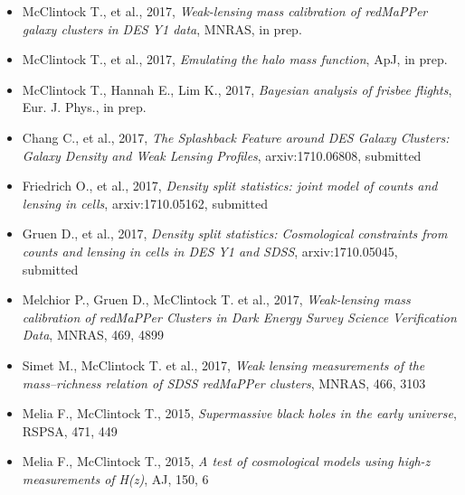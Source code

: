 \documentclass{res}
\begin{document}
\thispagestyle{empty} %
\address{{\bf Address} \\ 1308 E Spring Street \\
	University of Arizona \\  Tucson, Arizona, USA  \\ (631) 418-5304}
\address{{\bf On the web} \\\url{https://github.com/tmcclintock} \\
  \href{mailto:tmcclintock@email.arizona.edu}{tmcclintock@email.arizona.edu}}

\begin{resume}

\vspace{8pt}
\begin{itemize}\itemsep -2pt
\item McClintock T., et al., 2017, {\it Weak-lensing mass calibration of redMaPPer galaxy clusters in DES Y1 data}, MNRAS, in prep.
\item McClintock T., et al., 2017, {\it Emulating the halo mass function}, ApJ, in prep.
\item McClintock T., Hannah E., Lim K., 2017, {\it Bayesian analysis of frisbee flights}, Eur. J. Phys., in prep.
\item Chang C., et al., 2017, {\it The Splashback Feature around DES Galaxy Clusters: Galaxy Density and Weak Lensing Profiles}, arxiv:1710.06808, submitted
\item Friedrich O., et al., 2017, {\it Density split statistics: joint model of counts and lensing in cells},  arxiv:1710.05162, submitted
\item Gruen D., et al., 2017, {\it Density split statistics: Cosmological constraints from counts and lensing in cells in DES Y1 and SDSS}, arxiv:1710.05045, submitted
\item Melchior P., Gruen D., McClintock T. et al., 2017, {\it Weak-lensing mass calibration of redMaPPer Clusters in Dark Energy Survey Science Verification Data}, MNRAS, 469, 4899
\item Simet M., McClintock T. et al., 2017, {\it Weak lensing measurements of the mass--richness relation of SDSS redMaPPer clusters}, MNRAS, 466, 3103
\item Melia F., McClintock T., 2015, {\it Supermassive black holes in the early universe}, RSPSA, 471, 449
\item Melia F., McClintock T., 2015, {\it A test of cosmological models using high-z measurements of H(z)}, AJ, 150, 6
\end{itemize}  
 
\end{resume} 
\end{document}
